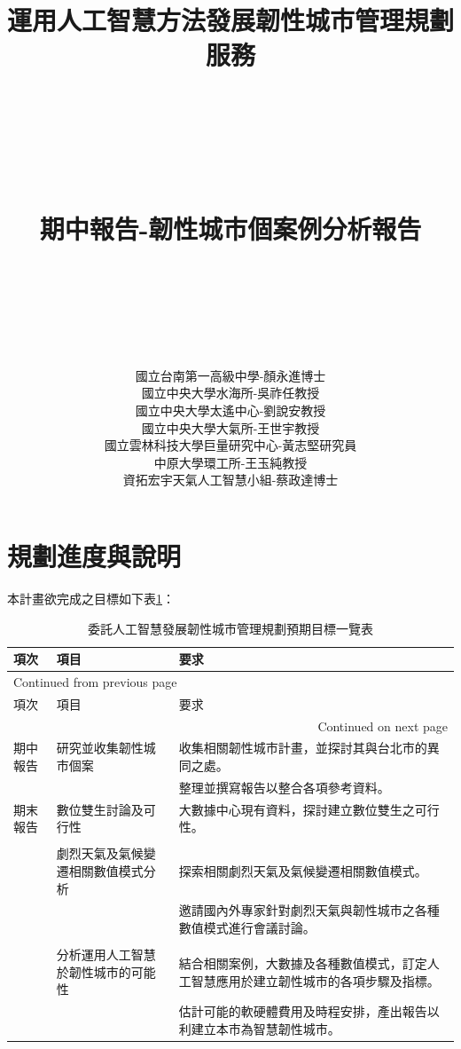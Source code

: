 \documentclass[a4paper,12pt]{article}
\author{國立台南第一高級中學-顏永進博士\\國立中央大學水海所-吳祚任教授\\國立中央大學太遙中心-劉說安教授\\國立中央大學大氣所-王世宇教授\\國立雲林科技大學巨量研究中心-黃志堅研究員\\中原大學環工所-王玉純教授\\資拓宏宇天氣人工智慧小組-蔡政達博士\newpage}
\date{}
\title{運用人工智慧方法發展韌性城市管理規劃服務\\\medskip
\large \\\\\\\\期中報告-韌性城市個案例分析報告\\\\\\\\}
\begin{document}
\maketitle
\tableofcontents


\section{規劃進度與說明}
\label{sec:org5e5923d}
本計畫欲完成之目標如下表\ref{table1}：\\
\begin{longtable}{|p{0.8cm}|p{4cm}|p{12cm}|}
\caption{\label{table1}委託人工智慧發展韌性城市管理規劃預期目標一覽表}
\\
\hline
項次 & 項目 & 要求\\
\hline
\endfirsthead
\multicolumn{3}{l}{Continued from previous page} \\
\hline

項次 & 項目 & 要求 \\

\hline
\endhead
\hline\multicolumn{3}{r}{Continued on next page} \\
\endfoot
\endlastfoot
\hline
期中報告 & 研究並收集韌性城市個案 & 收集相關韌性城市計畫，並探討其與台北市的異同之處。\\
 &  & 整理並撰寫報告以整合各項參考資料。\\
\hline
期末報告 & 數位雙生討論及可行性 & 大數據中心現有資料，探討建立數位雙生之可行性。\\
 &  & \\
 & 劇烈天氣及氣候變遷相關數值模式分析 & 探索相關劇烈天氣及氣候變遷相關數值模式。\\
 &  & 邀請國內外專家針對劇烈天氣與韌性城市之各種數值模式進行會議討論。\\
 &  & \\
 & 分析運用人工智慧於韌性城市的可能性 & 結合相關案例，大數據及各種數值模式，訂定人工智慧應用於建立韌性城市的各項步驟及指標。\\
 &  & 估計可能的軟硬體費用及時程安排，產出報告以利建立本市為智慧韌性城市。\\
\hline
\end{longtable}
\newpage
\end{document}
